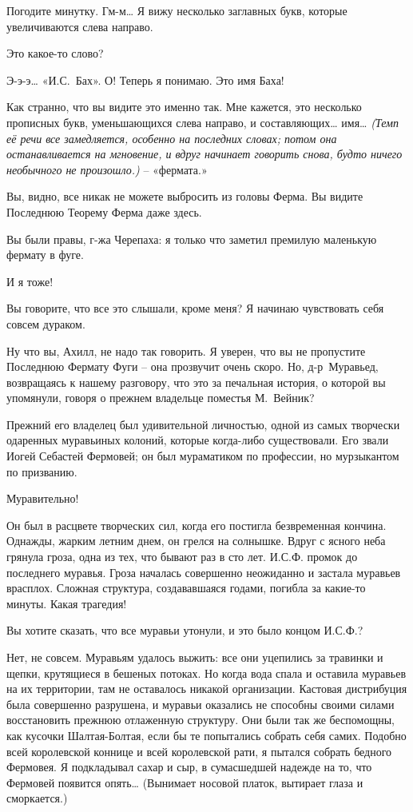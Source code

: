 \documentclass[../main.tex]{subfiles}
\begin{document}
\begin{dialogue}
 Погодите минутку. Гм-м\ldots{} Я вижу несколько заглавных букв, которые увеличиваются слева направо.

 Это какое-то слово?

 Э-э-э\ldots{} «И.С.~Бах». О! Теперь я понимаю. Это имя Баха!

 Как странно, что вы видите это именно так. Мне кажется, это несколько прописных букв, уменьшающихся слева направо, и составляющих\ldots{} имя\ldots{} \emph{(Темп её речи все замедляется, особенно на последних словах; потом она останавливается на мгновение, и вдруг начинает говорить снова, будто ничего необычного не произошло.)} \--- «фермата.»

 Вы, видно, все никак не можете выбросить из головы Ферма. Вы видите Последнюю Теорему Ферма даже здесь.

 Вы были правы, г-жа Черепаха: я только что заметил премилую маленькую фермату в фуге.

 И я тоже!

 Вы говорите, что все это слышали, кроме меня? Я начинаю чувствовать себя совсем дураком.

 Ну что вы, Ахилл, не надо так говорить. Я уверен, что вы не пропустите Последнюю Фермату Фуги \--- она прозвучит очень скоро. Но, д-р~Муравьед, возвращаясь к нашему разговору, что это за печальная история, о которой вы упомянули, говоря о прежнем владельце поместья М.~Вейник?

 Прежний его владелец был удивительной личностью, одной из самых творчески одаренных муравьиных колоний, которые когда-либо существовали. Его звали Иогей Себастей Фермовей; он был мураматиком по профессии, но мурзыкантом по призванию.

 Муравительно!

 Он был в расцвете творческих сил, когда его постигла безвременная кончина. Однажды, жарким летним днем, он грелся на солнышке. Вдруг с ясного неба грянула гроза, одна из тех, что бывают раз в сто лет. И.С.Ф. промок до последнего муравья. Гроза началась совершенно неожиданно и застала муравьев врасплох. Сложная структура, создававшаяся годами, погибла за какие-то минуты. Какая трагедия!

 Вы хотите сказать, что все муравьи утонули, и это было концом И.С.Ф.?

 Нет, не совсем. Муравьям удалось выжить: все они уцепились за травинки и щепки, крутящиеся в бешеных потоках. Но когда вода спала и оставила муравьев на их территории, там не оставалось никакой организации. Кастовая дистрибуция была совершенно разрушена, и муравьи оказались не способны своими силами восстановить прежнюю отлаженную структуру. Они были так же беспомощны, как кусочки Шалтая-Болтая, если бы те попытались собрать себя самих. Подобно всей королевской коннице и всей королевской рати, я пытался собрать бедного Фермовея. Я подкладывал сахар и сыр, в сумасшедшей надежде на то, что Фермовей появится опять\ldots{} (Вынимает носовой платок, вытирает глаза и сморкается.)


\end{dialogue}
\end{document}
